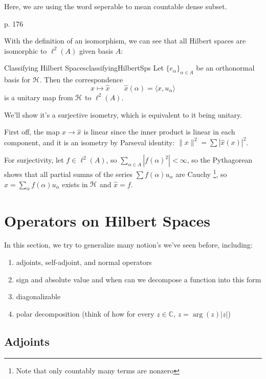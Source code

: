 \documentclass[oneside]{book}
\newcommand{\C}{\mathbb{C}}
\newcommand{\EH}{\EuScript{H}}
\newcommand{\rw}{\rightarrow}
\begin{document}
Here, we are using the word seperable to mean countable dense subset.

\begin{Proof}
p. 176
\end{Proof}

 With the definition of an isomorphism, we can see that all Hilbert spaces are
isomorphic to $\ell^2(A)$ given basis $A$:

\begin{thm}{Classifying Hilbert Spaces}{classifyingHilbertSps}
Let $\{e_\alpha\}_{\alpha \in A}$ be an orthonormal basis for $\EH$. Then the correspondence
\[
	x \mapsto \hat{x} \qquad \hat{x}(\alpha) = \langle x, u_\alpha \rangle
\]
is a unitary map from $\EH$ to $\ell^2(A)$.
\end{thm}

\begin{Proof}
	We'll show it's a surjective isometry, which is equivalent to it being unitary.

	First off, the map $x \rw \hat{x}$ is linear since the inner product is linear in each component, and it is an
	isometry by Parseval identity: $\|x\|^2 = \sum |\hat{x}(x)|^2$.

	For surjectivity, let $f \in \ell^2(A)$, so $\sum_{\alpha \in A} |f(\alpha)^2| < \infty$, so the Pythagorean shows
	that all partial sumns of the series $\sum f(\alpha)u_\alpha$ are Cauchy \footnote{Note that only countably many
	terms are nonzero}, so $x = \sum_\alpha f(\alpha)u_\alpha$ exists in $\EH$ and $\hat{x} = f$.
\end{Proof}



\section{Operators on Hilbert Spaces}

In this section, we try to generalize many notion's we've seen before, including:
\begin{enumerate}
	\item adjoints, self-adjoint, and normal operators
	\item sign and absolute value and when can we decompose a function into this form
	\item diagonalizable
	\item polar decomposition (think of how for every $z \in \C$, $z = \arg(z)|z|$)
\end{enumerate}

\subsection*{Adjoints}
\end{document}
